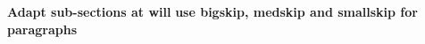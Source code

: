 \label{cap:chapter2}

\textbf{Adapt sub-sections at will}
\textbf{use bigskip, medskip and smallskip for paragraphs}




\cleardoublepage

